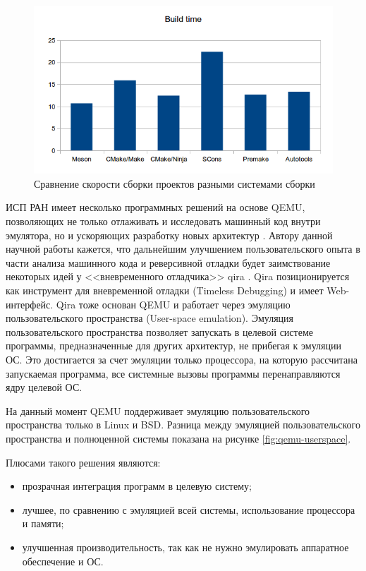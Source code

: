 \begin{figure}[!htbp]
    \centering
    \begin{adjustbox}{max totalsize={0.8\textwidth}{\textheight}}
        \includegraphics[]{images/buildtime.png}
    \end{adjustbox}
    \caption{Сравнение скорости сборки проектов разными системами сборки}\label{fig:ninja-buildtime}
\end{figure}


ИСП РАН имеет несколько программных решений на основе QEMU, позволяющих не только отлаживать и исследовать
машинный код внутри эмулятора, но и ускоряющих разработку новых архитектур \cite{imposters-toolset}.
Автору данной научной работы кажется, что дальнейшим улучшением пользовательского опыта в части анализа машинного кода
и реверсивной отладки будет заимствование некоторых идей у <<вневременного отладчика>> qira \cite{qira}.
Qira позиционируется как инструмент для вневременной отладки (Timeless Debugging) и имеет Web-интерфейс.
Qira тоже основан QEMU и работает через эмуляцию пользовательского пространства (User-space emulation).
Эмуляция пользовательского пространства позволяет запускать в целевой системе программы,
предназначенные для других архитектур, не прибегая к эмуляции ОС.
Это достигается за счет эмуляции только процессора, на которую рассчитана запускаемая
программа, все системные вызовы программы перенаправляются ядру целевой ОС.

На данный момент QEMU поддерживает эмуляцию пользовательского пространства только в Linux и BSD.
Разница между эмуляцией пользовательского пространства и полноценной системы показана на рисунке
\ref{fig:qemu-userspace}.

Плюсами такого решения являются:
\begin{itemize}
    \item прозрачная интеграция программ в целевую систему;
    \item лучшее, по сравнению с эмуляцией всей системы, использование процессора и памяти;
    \item улучшенная производительность, так как не нужно эмулировать аппаратное обеспечение и ОС.
\end{itemize}


